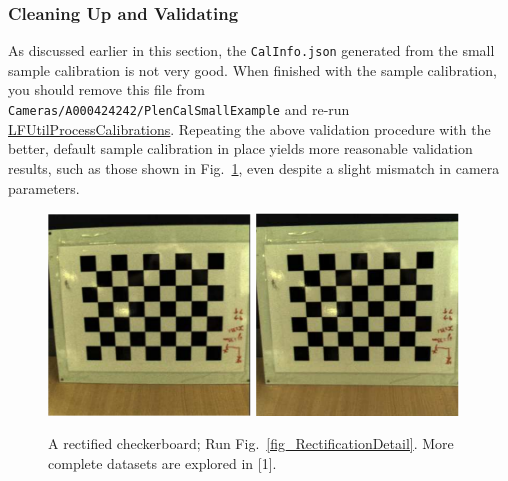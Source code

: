\documentclass[onecolumn]{article}
\newcommand{\CiteFunction}[1]{\hyperlink{#1}{\small #1}}
\newcommand{\SymbolText}[1]{\texttt{\small #1}}
\begin{document}
\subsubsection{Cleaning Up and Validating}

As discussed earlier in this section, the \SymbolText{CalInfo.json} generated from the small sample calibration is not very good.  When finished with the sample calibration, you should remove this file from\\ \SymbolText{Cameras/A000424242/PlenCalSmallExample} and re-run \CiteFunction{LFUtilProcessCalibrations}. Repeating the above validation procedure with the better, default sample calibration in place yields more reasonable validation results, such as those shown in Fig.~\ref{fig_CalibrationExampleRectification}, even despite a slight mismatch in camera parameters.

\begin{figure}[tbh]
	\centering
	\includegraphics[width=0.48\textwidth]{Figs/SampleCalibrationRectIn}
	\includegraphics[width=0.48\textwidth]{Figs/SampleCalibrationRectOut}
	\caption{A rectified checkerboard; Run Fig.~\ref{fig_RectificationDetail}. More complete datasets are explored in [1].}
	\label{fig_CalibrationExampleRectification}
\end{figure}
\end{document}

